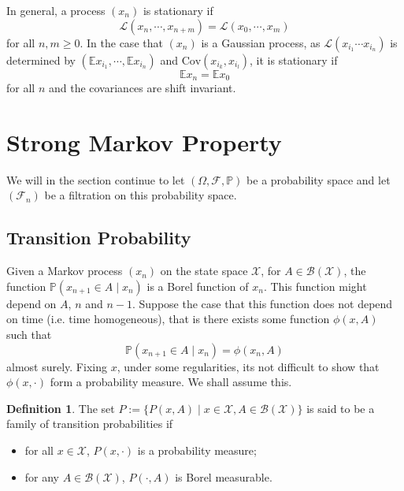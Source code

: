 \documentclass[]{article}
\theoremstyle{definition}
\theoremstyle{definition}
\newtheorem{definition}{Definition}[section]
\begin{document}
In general, a process \((x_n)\) is stationary if 
\[\mathcal{L}(x_n, \cdots, x_{n + m}) = \mathcal{L}(x_0, \cdots, x_m)\]
for all \(n, m \ge 0\). In the case that \((x_n)\) is a Gaussian process, 
as \(\mathcal{L}(x_{i_1} \cdots x_{i_n})\) is determined by 
\((\mathbb{E}x_{i_1}, \cdots, \mathbb{E}x_{i_n})\) and \(\text{Cov}(x_{i_k}, x_{i_l})\),
it is stationary if 
\[\mathbb{E}x_n = \mathbb{E}x_0\]
for all \(n\) and the covariances are shift invariant.

\newpage 

\section{Strong Markov Property}

We will in the section continue to let \((\Omega, \mathcal{F}, \mathbb{P})\) be a 
probability space and let \((\mathcal{F}_n)\) be a filtration on this probability 
space.

\subsection{Transition Probability}

Given a Markov process \((x_n)\) on the state space \(\mathcal{X}\), for 
\(A \in \mathcal{B}(\mathcal{X})\), the function \(\mathbb{P}(x_{n + 1} \in A \mid x_n)\) 
is a Borel function of \(x_n\). This function might depend on \(A\), 
\(n\) and \(n - 1\). Suppose the case that this function does not depend on time 
(i.e. time homogeneous), that is there exists some function \(\phi(x, A)\) such that 
\[\mathbb{P}(x_{n + 1} \in A \mid x_n) = \phi(x_n, A)\]
almost surely. Fixing \(x\), under some regularities, its not difficult to show that 
\(\phi(x, \cdot)\) form a probability measure. We shall assume this.

\begin{definition}
  The set \(P := \{P(x, A) \mid x \in \mathcal{X}, A \in \mathcal{B}(\mathcal{X})\}\)
  is said to be a family of transition probabilities if
  \begin{itemize}
    \item for all \(x \in \mathcal{X}\), \(P(x, \cdot)\) is a probability 
      measure;
    \item for any \(A \in \mathcal{B}(\mathcal{X})\), \(P(\cdot, A)\) is Borel 
      measurable.
  \end{itemize} 
\end{definition}
\end{document}

